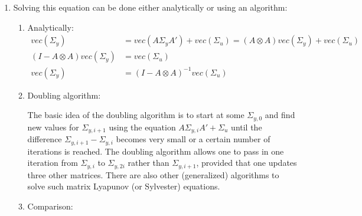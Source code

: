 \begin{enumerate}
\item Solving this equation can be done either analytically or using an algorithm:
\begin{enumerate}
	\item Analytically:
	\begin{align*}
	vec(\Sigma_y) &= vec(A \Sigma_y A') + vec(\Sigma_u) = (A \otimes A)vec(\Sigma_y) + vec(\Sigma_u)\\
	(I-A\otimes A)vec(\Sigma_y) &= vec(\Sigma_u)\\
	vec(\Sigma_y) &= (I-A\otimes A)^{-1}vec(\Sigma_u)
	\end{align*}
	\item Doubling algorithm:
	
	The basic idea of the doubling algorithm is to start at some $\Sigma_{y,0}$
	  and find new values for $\Sigma_{y,i+1}$ using the equation $A \Sigma_{y,i} A' + \Sigma_u$
	  until the difference $\Sigma_{y,i+1} - \Sigma_{y,i}$ becomes very small or a certain number of iterations is reached.
	The doubling algorithm allows one to pass in one iteration from $\Sigma_{y,i}$ to $\Sigma_{y,2i}$ rather than $\Sigma_{y,i+1}$,
	  provided that one updates three other matrices.
	There are also other (generalized) algorithms to solve such matrix Lyapunov (or Sylvester) equations.
	\item Comparison:
	
	\end{enumerate}

\end{enumerate}